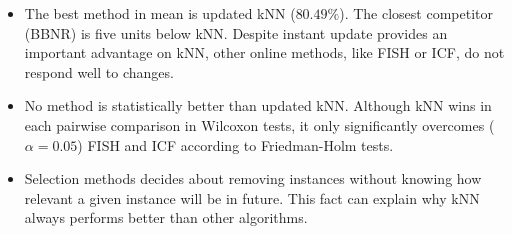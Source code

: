 \documentclass[preprint,12pt]{elsarticle}
\begin{document}
\begin{itemize}
	\item The best method in mean is updated kNN ($80.49\%$). The closest competitor (BBNR) is five units below kNN. Despite instant update provides an important advantage on kNN, other online methods, like FISH or ICF, do not respond well to changes.
	\item No method is statistically better than updated kNN. Although kNN wins in each pairwise comparison in Wilcoxon tests, it only significantly overcomes ($\alpha = 0.05$) FISH and ICF according to Friedman-Holm tests.
	\item Selection methods decides about removing instances without knowing how relevant a given instance will be in future. This fact can explain why kNN always performs better than other algorithms. %
\end{itemize}
\end{document}
